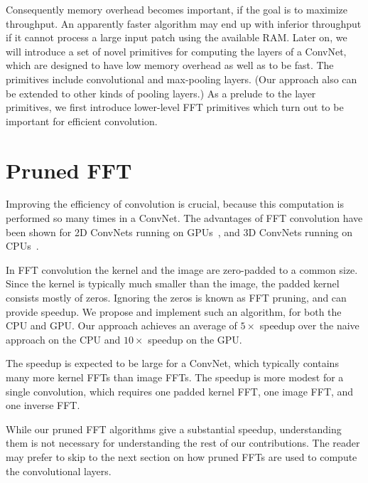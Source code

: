 \documentclass[conference]{./IEEEtran}
\begin{document}
  Consequently memory overhead becomes important, if the goal is to
  maximize throughput.  An apparently faster algorithm may end up with
  inferior throughput if it cannot process a large input patch using
  the available RAM.  Later on, we will introduce a set of novel
  primitives for computing the layers of a ConvNet, which are designed
  to have low memory overhead as well as to be fast.  The primitives
  include convolutional and max-pooling layers.  (Our approach also
  can be extended to other kinds of pooling layers.)  As a prelude to
  the layer primitives, we first introduce lower-level FFT primitives
  which turn out to be important for efficient convolution.

\section{Pruned FFT}

  Improving the efficiency of convolution is crucial, because this
  computation is performed so many times in a ConvNet.  The advantages
  of FFT convolution have been shown for 2D ConvNets running on
  GPUs~\cite{mathieu-iclr-14,vasilache2014fast}, and 3D ConvNets
  running on CPUs~\cite{zlateski2015znn}.

  In FFT convolution the kernel and the image are zero-padded to a
  common size.  Since the kernel is typically much smaller than the
  image, the padded kernel consists mostly of zeros.  Ignoring the
  zeros is known as FFT pruning, and can provide speedup.  We propose
  and implement such an algorithm, for both the CPU and GPU. Our
  approach achieves an average of $5 \times$ speedup over the naive
  approach on the CPU and $10 \times$ speedup on the GPU.

  The speedup is expected to be large for a ConvNet, which typically
  contains many more kernel FFTs than image FFTs.  The speedup is more
  modest for a single convolution, which requires one padded kernel
  FFT, one image FFT, and one inverse FFT.

  While our pruned FFT algorithms give a substantial speedup,
  understanding them is not necessary for understanding the rest of
  our contributions.  The reader may prefer to skip to the next
  section on how pruned FFTs are used to compute the convolutional
  layers.
\end{document}
